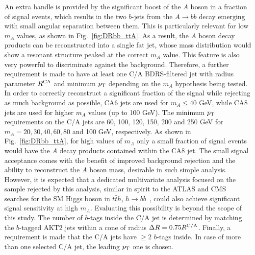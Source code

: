 \documentclass[preprintnumbers,superscriptaddress,nofootinbib,aps,prd,floatfix]{revtex4}
\newcommand{\pt}{p_{\rm{T}}}
\begin{document}
An extra handle is provided by the significant boost of the $A$ boson in a fraction of signal 
events, which results in the two $b$-jets from the $A \to b\bar{b}$ decay emerging with small angular separation between them.
This is particularly relevant for low $m_A$ values, as shown in Fig.~\ref{fig:DRbb_ttA}.
As a result, the $A$ boson decay products can be reconstructed into a single fat jet, whose mass distribution would show a 
resonant structure peaked at the correct $m_A$ value. This feature is also very powerful to discriminate against the background.
Therefore, a further requirement is made to have at least one C/A BDRS-filtered jet with radius parameter $R^{\rm CA}$ and minimum $\pt$
depending on the $m_A$ hypothesis being tested. In order to correctly reconstruct a significant fraction of the signal while rejecting as 
much background as possible,  CA6 jets are used for $m_A \leq 40$ GeV, while CA8 jets are used for higher $m_A$ values (up to 100 GeV). 
The minimum $\pt$ requirements on the C/A jets are 60, 100, 120, 150, 200 and 250 GeV for
$m_A=20, 30, 40, 60, 80$ and 100 GeV, respectively. 
As shown in Fig.~\ref{fig:DRbb_ttA}, for high values of $m_A$ only a small fraction of signal events would have the $A$ decay products contained
within the CA8 jet. The small signal acceptance comes with the benefit of improved background rejection and
the ability to reconstruct the $A$ boson mass, desirable in such simple analysis. However, it is expected that a dedicated multivariate 
analysis focused on the sample rejected by this analysis, similar in spirit to the ATLAS and CMS searches for the SM Higgs boson in 
$t\bar{t} h$, $h \to b\bar{b}$~\cite{Aad:2015gra,Khachatryan:2015ila}, could also achieve significant signal sensitivity at high $m_A$. 
Evaluating this possibility is beyond the scope of this study.
The number of $b$-tags inside the C/A jet is determined by
matching the $b$-tagged AKT2 jets within a cone of radius $\Delta R =0.75 R^{\rm C/A}$. 
Finally, a requirement is made that the C/A jets have $\geq$2 $b$-tags inside. In case of more than one selected C/A jet,
the leading $\pt$ one is chosen. 
\end{document}
